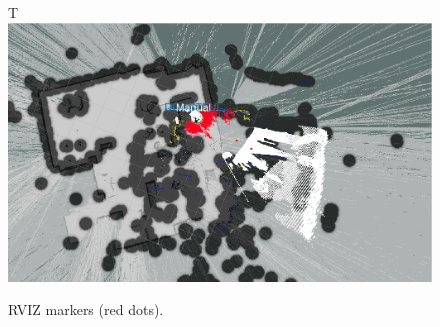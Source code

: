 \begin{figure}[H]
  \begin{center}
T    \includegraphics[width=.9\linewidth]{images/chapter4_markers.png}
  \end{center}
  \caption{RVIZ markers (red dots).}
  \label{fig:markers}
\end{figure}